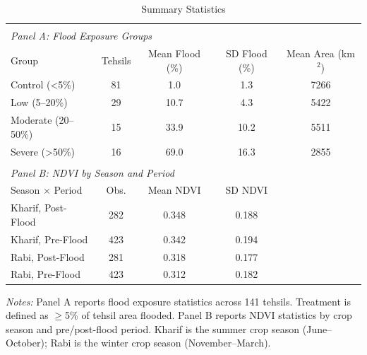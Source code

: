 \begin{table}[htbp]
\centering
\caption{Summary Statistics}
\label{tab:summary}
\begin{tabular}{lcccc}
\hline\hline
\\[-1.8ex]
\multicolumn{5}{l}{\textit{Panel A: Flood Exposure Groups}} \\
\hline
Group & Tehsils & Mean Flood (\%) & SD Flood (\%) & Mean Area (km$^2$) \\
\hline
Control (<5\%) & 81 & 1.0 & 1.3 & 7266 \\
Low (5--20\%) & 29 & 10.7 & 4.3 & 5422 \\
Moderate (20--50\%) & 15 & 33.9 & 10.2 & 5511 \\
Severe (>50\%) & 16 & 69.0 & 16.3 & 2855 \\
\\[-1.8ex]
\multicolumn{5}{l}{\textit{Panel B: NDVI by Season and Period}} \\
\hline
Season $\times$ Period & Obs. & Mean NDVI & SD NDVI & \\
\hline
Kharif, Post-Flood & 282 & 0.348 & 0.188 & \\
Kharif, Pre-Flood & 423 & 0.342 & 0.194 & \\
Rabi, Post-Flood & 281 & 0.318 & 0.177 & \\
Rabi, Pre-Flood & 423 & 0.312 & 0.182 & \\
\hline\hline
\end{tabular}
\par\vspace{0.3em}
\small
\textit{Notes:} Panel A reports flood exposure statistics across 141 tehsils. Treatment is defined as $\geq$5\% of tehsil area flooded. Panel B reports NDVI statistics by crop season and pre/post-flood period. Kharif is the summer crop season (June--October); Rabi is the winter crop season (November--March).

\end{table}
